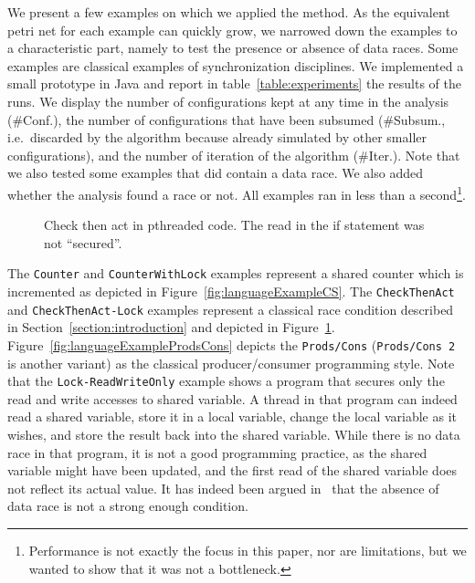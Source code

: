 \label{section:experiments}

We present a few examples on which we applied the method. As the
equivalent petri net for each example can quickly grow, we narrowed
down the examples to a characteristic part, namely to test the
presence or absence of data races. Some examples are classical
examples of synchronization disciplines. We implemented a small
prototype in Java and report in table~\ref{table:experiments} the
results of the runs. We display the number of configurations kept at
any time in the analysis (\#Conf.), the number of configurations that
have been subsumed (\#Subsum., i.e.\ discarded by the algorithm
because already simulated by other smaller configurations), and the
number of iteration of the algorithm (\#Iter.). Note that we also
tested some examples that did contain a data race. We also added
whether the analysis found a race or not. All examples ran in less
than a second\footnote{ Performance is not exactly the focus in this
  paper, nor are limitations, but we wanted to show that it was not a
  bottleneck.}.

\begin{figure}
  \caption{Check then act in pthreaded code. The read in the if statement was not ``secured''.}
  \label{fig:checkthenact}
\end{figure}

The \verb+Counter+ and \verb+CounterWithLock+ examples represent a
shared counter which is incremented as depicted in
Figure~\ref{fig:languageExampleCS}. The \verb+CheckThenAct+ and
\verb+CheckThenAct-Lock+ examples represent a classical race condition
described in Section~\ref{section:introduction} and depicted in
Figure~\ref{fig:checkthenact}.
%
Figure~\ref{fig:languageExampleProdsCons} depicts the
\verb+Prods/Cons+ (\verb+Prods/Cons 2+ is another variant) as the
classical producer/consumer programming style.
%
Note that the \verb+Lock-ReadWriteOnly+ example shows a program that
secures only the read and write accesses to shared variable. A thread
in that program can indeed read a shared variable, store it in a local
variable, change the local variable as it wishes, and store the result
back into the shared variable. While there is no data race in that
program, it is not a good programming practice, as the shared variable
might have been updated, and the first read of the shared variable
does not reflect its actual value. It has indeed been argued
in~\cite{FQ03} that the absence of data race is not a strong enough
condition.

